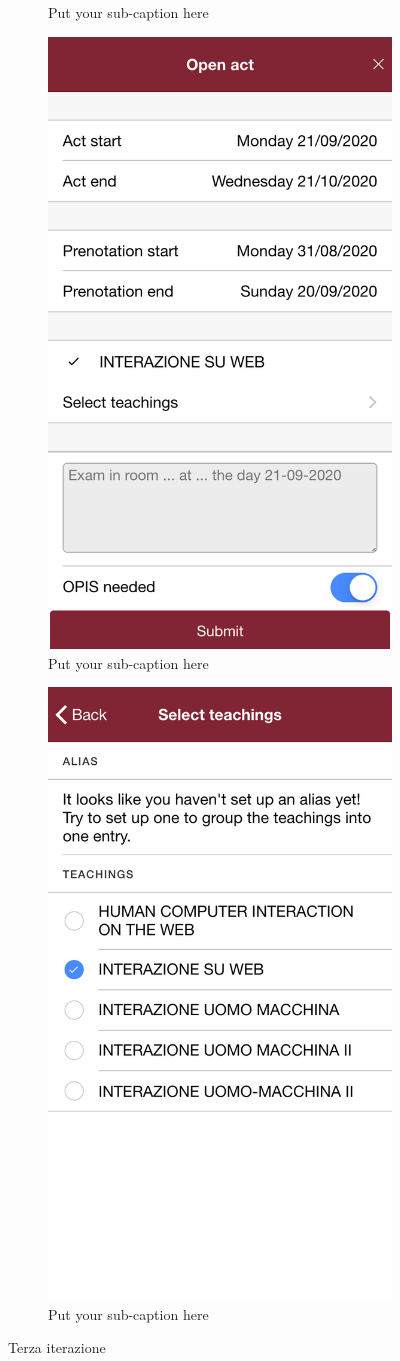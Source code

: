 \documentclass[Lau, oneside]{sapthesis}%
\begin{document}
\begin{figure}[H]
\begin{subfigure}{0.6\textwidth}
	  \caption{Put your sub-caption here}
	  \label{fig:sub-second}
	\end{subfigure}
	\begin{subfigure}{0.6\textwidth}
		\centering
		\includegraphics[width=0.5\linewidth]{ui-iterations/iii/form}  
		\caption{Put your sub-caption here}
		\label{fig:sub-second}
	  \end{subfigure}
	  \begin{subfigure}{0.6\textwidth}
		\centering
		\includegraphics[width=0.5\linewidth]{ui-iterations/iii/insegnamenti}  
		\caption{Put your sub-caption here}
		\label{fig:sub-second}
	  \end{subfigure}
	  
	\caption{Terza iterazione}
	\label{fig:it-3}
\end{figure}
\end{document}
